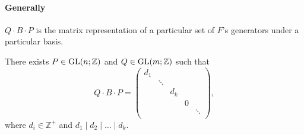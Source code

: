 \paragraph{Generally} \(Q\cdot B\cdot P\) is the matrix representation of a particular set of \(F\)'s generators under a particular basis.

\begin{proposition}\label{prop:appendix-1}
	There exists \(P\in \mathrm{GL}(n; \mathbb{Z} ) \) and \(Q\in \mathrm{GL}(m; \mathbb{Z} ) \) such that
	\[
		Q\cdot B\cdot P = \begin{pmatrix}
			d_1 &        &       &   &        \\
			    & \ddots &       &   &        \\
			    &        & d_{k} &   &        \\
			    &        &       & 0 &        \\
			    &        &       &   & \ddots \\
		\end{pmatrix},
	\]
	where \(d_{i} \in \mathbb{Z} ^+\) and \(d_1 \mid d_2 \mid \dots \mid d_{k}  \).
\end{proposition}
